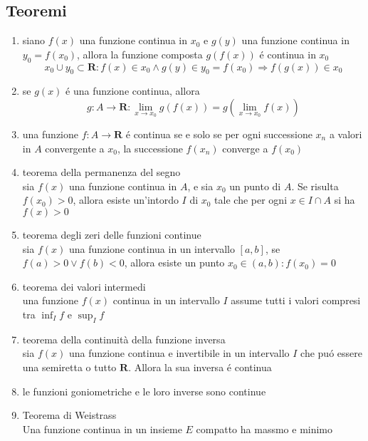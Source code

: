 \documentclass{exam}
\begin{document}
  \subsection{Teoremi}
    \begin{enumerate}
      \item
        siano $f(x)$ una funzione continua in $x_{0}$ e
        $g(y)$ una funzione continua in $y_{0}=f(x_{0})$, allora
        la funzione composta $g(f(x))$ \'e continua in $x_{0}$
        \begin{equation}
          x_{0}\cup y_{0}\subset \mathbf{R}:f(x) \in x_{0} \land g(y) 
          \in y_{0}=f(x_{0}) \Rightarrow f(g(x))\in x_{0}
        \end{equation}
      \item
        se $g(x)$ \'e una funzione continua, allora
        \begin{equation}
          g:A\rightarrow \mathbf{R}:\lim_{x\to x_{0}}g(f(x))=g(\lim_{x\to x_{0}}f(x))
        \end{equation}
      \item
        una funzione $f:A\rightarrow \mathbf{R}$ \'e continua se e solo se per ogni successione $x_{n}$ a valori in $A$ convergente a $x_{0}$, la successione $f(x_{n})$ converge a $f(x_{0})$
      \item{teorema della permanenza del segno}\\
        sia $f(x)$ una funzione continua in $A$, e sia $x_{0}$ un punto di $A$. Se risulta $f(x_{0})>0$, allora esiste un'intordo $I$ di $x_{0}$ tale che per ogni $x\in I\cap A$ si ha $f(x)>0$
      \item{teorema degli zeri delle funzioni continue}\\
        sia $f(x)$ una funzione continua in un intervallo $[a,b]$, se $f(a)>0 \lor f(b)<0$, allora esiste un punto $x_{0}\in (a,b):f(x_{0})=0$
      \item{teorema dei valori intermedi}\\
        una funzione $f(x)$ continua in un intervallo $I$ assume tutti i valori compresi tra $\inf_{I}f$ e $\sup_{I}f$
      \item{teorema della continuità della funzione inversa}\\
        sia $f(x)$ una funzione continua e invertibile in un intervallo $I$ che pu\'o essere una semiretta o tutto $\mathbf{R}$. Allora la sua inversa \'e continua
      \item le funzioni goniometriche e le loro inverse sono continue
      \item{Teorema di Weistrass}\\
        Una funzione continua in un insieme $E$ compatto ha massmo e minimo
    \end{enumerate}
  \newpage
\end{document}
